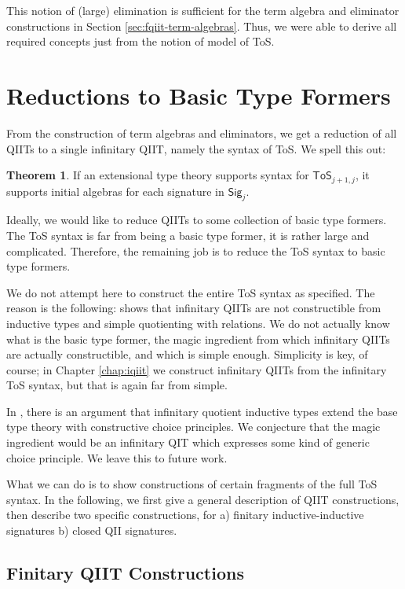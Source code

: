 \documentclass[12pt,a4paper,twoside,openany]{book}
\theoremstyle{remark}
\theoremstyle{definition}
\theoremstyle{theorem}
\newtheorem{theorem}{Theorem}
\newcommand{\ToS}{\mathsf{ToS}}
\newcommand{\Sig}{\mathsf{Sig}}
\begin{document}
This notion of (large) elimination is sufficient for the term algebra and
eliminator constructions in Section \ref{sec:fqiit-term-algebras}. Thus, we were
able to derive all required concepts just from the notion of model of ToS.

\section{Reductions to Basic Type Formers}
\label{sec:finitary-reductions}

From the construction of term algebras and eliminators, we get a reduction of
all QIITs to a single infinitary QIIT, namely the syntax of ToS. We spell this out:

\begin{theorem} If an extensional type theory supports syntax for $\ToS_{j+1,j}$, it supports
initial algebras for each signature in $\Sig_j$.
\end{theorem}

Ideally, we would like to reduce QIITs to some collection of basic type
formers. The ToS syntax is far from being a basic type former, it is rather
large and complicated. Therefore, the remaining job is to reduce the ToS syntax
to basic type formers.

We do not attempt here to construct the entire ToS syntax as specified. The
reason is the following: \cite[Section 9]{lumsdaineShulman} shows that
infinitary QIITs are not constructible from inductive types and simple
quotienting with relations. We do not actually know what is the basic type
former, the magic ingredient from which infinitary QIITs are actually
constructible, and which is simple enough. Simplicity is key, of course; in
Chapter \ref{chap:iqiit} we construct infinitary QIITs from the infinitary ToS
syntax, but that is again far from simple.

In \cite[Section~2.2]{ttintt}, there is an argument that infinitary quotient
inductive types extend the base type theory with constructive choice
principles. We conjecture that the magic ingredient would be an infinitary QIT
which expresses some kind of generic choice principle. We leave this to future
work.

What we can do is to show constructions of certain fragments of the full ToS
syntax. In the following, we first give a general description of QIIT constructions,
then describe two specific constructions, for a) finitary inductive-inductive signatures
b) closed QII signatures.

\subsection{Finitary QIIT Constructions}
\label{sec:fqiit-constructions}
\end{document}
